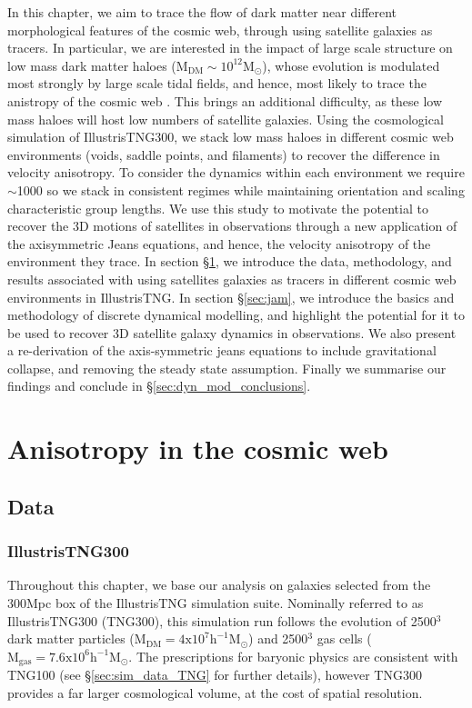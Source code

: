 In this chapter, we aim to trace the flow of dark matter near different morphological features of the cosmic web, through using satellite galaxies as tracers. In particular, we are interested in the impact of large scale structure on low mass dark matter haloes ($\mathrm{M_{DM} \sim 10^{12}M_{\odot}}$), whose evolution is modulated most strongly by large scale tidal fields, and hence, most likely to trace the anistropy of the cosmic web \citep[e.g.][]{tojeiro2017}. This brings an additional difficulty, as these low mass haloes will host low numbers of satellite galaxies. Using the cosmological simulation of IllustrisTNG300, we stack low mass haloes in different cosmic web environments (voids, saddle points, and filaments) to recover the difference in velocity anisotropy. To consider the dynamics within each environment we require $\sim$1000 so we stack in consistent regimes while maintaining orientation and scaling characteristic group lengths. We use this study to motivate the potential to recover the 3D motions of satellites in observations through a new application of the axisymmetric Jeans equations, and hence, the velocity anisotropy of the environment they trace. In section \S\ref{sec:dyn_mod_aniso}, we introduce the data, methodology, and results associated with using satellites galaxies as tracers in different cosmic web environments in IllustrisTNG. In section \S\ref{sec:jam}, we introduce the basics and methodology of discrete dynamical modelling, and highlight the potential for it to be used to recover 3D satellite galaxy dynamics in observations. We also present a re-derivation of the axis-symmetric jeans equations to include gravitational collapse, and removing the steady state assumption. Finally we summarise our findings and conclude in \S\ref{sec:dyn_mod_conclusions}.

\section{Anisotropy in the cosmic web} \label{sec:dyn_mod_aniso}
\subsection{Data}
\subsubsection{IllustrisTNG300}
Throughout this chapter, we base our analysis on galaxies selected from the 300Mpc box of the IllustrisTNG simulation suite. Nominally referred to as IllustrisTNG300 (TNG300), this simulation run follows the evolution of 2500$^3$ dark matter particles ($\mathrm{M_{DM} = 4 x 10^{7}h^{-1}M_{\odot}}$) and 2500$^3$ gas cells ($\mathrm{M_{gas} = 7.6 x 10^{6}h^{-1}M_{\odot}}$. The prescriptions for baryonic physics are consistent with TNG100 (see \S\ref{sec:sim_data_TNG} for further details), however TNG300 provides a far larger cosmological volume, at the cost of spatial resolution.

